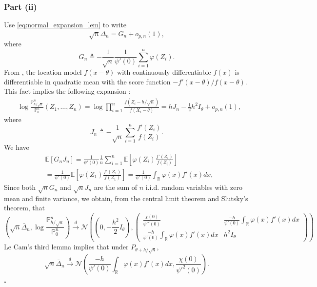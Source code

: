 \documentclass[letterpaper, 11pt]{IEEEtran}      %
\newcommand{\ex}[1]{\ensuremath{\mathbb{E}\left[ #1\right]}}
\newcommand{\Prob}{\mathbb{P} }
\newcommand*{\QEDA}{\hfill\ensuremath{\square}}
\newcommand{\Ncal}{\mathcal{N}}
\begin{document}
{\subsubsection*{Part (ii)}
Use \eqref{eq:normal_expansion_lem} to write
\[
\sqrt{n} \bar{\Delta}_n = G_n + o_{p,n}(1),
\]
where
\[
G_n \triangleq -\frac{1}{\sqrt{n}} \frac{1}{\psi'(0)} \sum_{i=1}^{n} \varphi(Z_i). 
\]
From \cite[Exm. 7.8]{van2000asymptotic}, the location model $f(x-\theta)$ with continuously differentiable $f(x)$ is differentiable in quadratic mean with the score function $-f'(x-\theta)/f(x-\theta)$. This fact implies the following expansion \cite[Thm. 7.2]{van2000asymptotic}:
\begin{align}
\label{eq:PJ_LAN}
& \log \frac{\Prob^n_{h/\sqrt{n}}}{\Prob^n_0} (Z_1,\ldots,Z_n) =  \log \prod_{i=1}^{n} \frac{f(Z_i-h/\sqrt{n})}  {f(X_i-\theta)} = h J_n - \frac{1}{2}h^2 I_{\theta} + o_{p,n}(1),
\end{align}
where 
\[
J_n \triangleq -\frac{1}{\sqrt{n}} \sum_{i=1}^n \frac{f'(Z_i)}{f(Z_i)} .
\]
We have
\begin{align*}
& \ex{ G_n J_n} = \frac{1}{\psi'(0)}\frac{1}{n} \sum_{i=1}^n \ex{ \varphi(Z_i) \frac{f'(Z_i)}{f(Z_i)} }  \\
& = \frac{1}{ \psi'(0)} \ex{ \varphi(Z_1) \frac{f'(Z_1)}{f(Z_1)}} =  \frac{1}{ \psi'(0)} \int_{\mathbb R} \varphi(x) f'(x) dx , 
\end{align*}
Since both $\sqrt{n}G_n$ and $\sqrt{n}J_n$ are the sum of $n$ i.i.d. random variables with zero mean and finite variance, we obtain, from the central limit theorem and Slutsky's theorem, that
\[
\left(\sqrt{n} \bar{\Delta}_n, \log \frac{\Prob^n_{h/\sqrt{n}}}{\Prob^n_0} \right) \overset{d}{\to} \Ncal \left( \left(0,-\frac{h^2}{2} I_\theta \right),  \begin{pmatrix}
\frac{\chi(0)}{\psi'^2(0)} & \frac{-h}{ \psi'(0)} \int_{\mathbb R} \varphi(x) f'(x) dx \\
\frac{-h}{ \psi'(0)} \int_{\mathbb R} \varphi(x) f'(x) dx & h^2 I_\theta 
\end{pmatrix}  \right)
\]
Le Cam's third lemma \cite[Exm. 6.7]{van2000asymptotic} implies that under $P_{\theta+h/\sqrt{n}}$, 
\[
\sqrt{n}\bar{\Delta}_n \overset{d}{\to} \Ncal\left(\frac{-h}{ \psi'(0)} \int_{\mathbb R} \varphi(x) f'(x) dx,  \frac{\chi(0)}{\psi'^2(0)} \right).
\]

\QEDA
}
\end{document}

